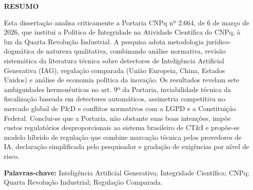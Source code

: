 \documentclass[
  12pt,
  a4paper,
  brazil,
  twoside
]{report}
\begin{document}
\newpage
\begin{center}
  \vspace*{2cm}
  {\Large\bfseries RESUMO\par}
  \vspace{1cm}
  \begin{minipage}{14cm}
  \onehalfspacing
  Esta dissertação analisa criticamente a Portaria CNPq nº 2.664, de 6
  de março de 2026, que institui a Política de Integridade na Atividade
  Científica do CNPq, à luz da Quarta Revolução Industrial. A pesquisa
  adota metodologia jurídico-dogmática de natureza qualitativa,
  combinando análise normativa, revisão sistemática da literatura
  técnica sobre detectores de Inteligência Artificial Generativa (IAG),
  regulação comparada (União Europeia, China, Estados Unidos) e análise
  de economia política da inovação. Os resultados revelam sete
  ambiguidades hermenêuticas no art. 9º da Portaria, inviabilidade
  técnica da fiscalização baseada em detectores automáticos, assimetria
  competitiva no mercado global de P\&D e conflitos normativos com a
  LGPD e a Constituição Federal. Conclui-se que a Portaria, não obstante
  suas boas intenções, impõe custos regulatórios desproporcionais ao
  sistema brasileiro de CT\&I e propõe-se modelo híbrido de regulação
  que combine marcação técnica pelos provedores de IA, declaração
  simplificada pelo pesquisador e gradação de exigências por nível de
  risco.
  \end{minipage}
  \vspace{1cm}
  \par\noindent
  \begin{minipage}{14cm}
  \textbf{Palavras-chave:} Inteligência Artificial Generativa;
Integridade Científica; CNPq; Quarta Revolução Industrial; Regulação
Comparada.
  \end{minipage}
\end{center}
\end{document}
